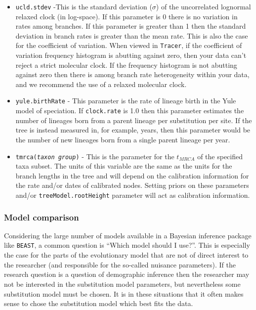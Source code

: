 \documentclass[cup7b, english]{cupbook}
\begin{document}
\begin{itemize}
\item \texttt{ucld.stdev} -This is the standard deviation ($\sigma$) of the uncorrelated lognormal relaxed
clock (in log-space). If this parameter is 0 there is no variation in rates among branches. If this parameter is greater
than 1 then the standard deviation in branch rates is greater than the mean rate. This is also the case for the
coefficient of variation.  When viewed in \texttt{Tracer}, if the coefficient of variation frequency histogram is abutting
against zero, then your data can't reject a strict molecular clock.  If the frequency histogram is not abutting against
zero then there is among branch rate heterogeneity within your data, and we recommend the use of a relaxed molecular
clock.

\item \texttt{yule.birthRate} - This parameter is the rate of lineage birth in the Yule model of speciation. If
\texttt{clock.rate} is 1.0 then this parameter estimates the number of lineages born from a parent lineage per substitution
per site. If the tree is instead measured in, for example, years, then this parameter would be the number of new lineages
born from a single parent lineage per year.

\item \texttt{tmrca({\it taxon group})} - This is the parameter for the $t_{MRCA}$ of the specified taxa
subset. The units of this variable are the same as the units for the branch
lengths in the tree and will depend on the calibration information for the rate and/or dates of calibrated nodes.
Setting priors on these parameters and/or \texttt{treeModel.rootHeight} parameter will act as calibration information.
\end{itemize}

\subsubsection{Model comparison}

Considering the large number of models available in a Bayesian inference package like \texttt{BEAST}, a common question is 
``Which model should I use?''. This is especially the case for the parts of the evolutionary model that are not of 
direct interest to the researcher (and responsible for the so-called nuisance parameters). If the research question 
is a question of demographic inference then the researcher may not be interested in the substitution model parameters, 
but nevertheless some substitution model must be chosen. It is in these situations that it often makes sense to chose 
the substitution model which best fits the data. 
\end{document}
